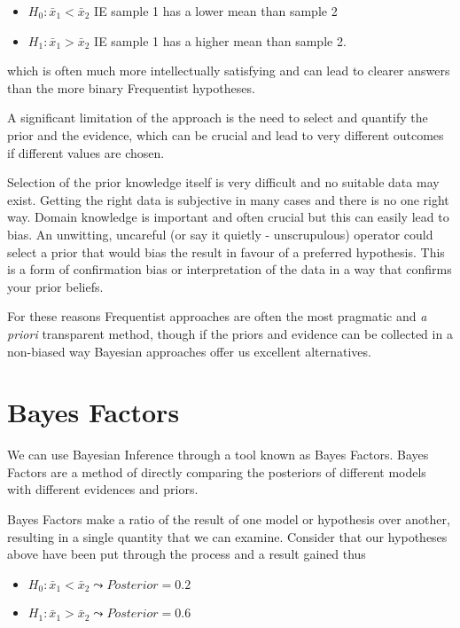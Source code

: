 \documentclass[
]{book}
\providecommand{\tightlist}{%
  \setlength{\itemsep}{0pt}\setlength{\parskip}{0pt}}
\begin{document}
\begin{itemize}
\tightlist
\item
  \(H_0 : \bar{x}_1 < \bar{x}_2\) IE sample 1 has a lower mean than sample 2
\item
  \(H_1 : \bar{x}_1 > \bar{x}_2\) IE sample 1 has a higher mean than sample 2.
\end{itemize}

which is often much more intellectually satisfying and can lead to clearer answers than the more binary Frequentist hypotheses.

A significant limitation of the approach is the need to select and quantify the prior and the evidence, which can be crucial and lead to very different outcomes if different values are chosen.

Selection of the prior knowledge itself is very difficult and no suitable data may exist. Getting the right data is subjective in many cases and there is no one right way. Domain knowledge is important and often crucial but this can easily lead to bias. An unwitting, uncareful (or say it quietly - unscrupulous) operator could select a prior that would bias the result in favour of a preferred hypothesis. This is a form of confirmation bias or interpretation of the data in a way that confirms your prior beliefs.

For these reasons Frequentist approaches are often the most pragmatic and \emph{a priori} transparent method, though if the priors and evidence can be collected in a non-biased way Bayesian approaches offer us excellent alternatives.

\hypertarget{bayes-factors}{%
\section{Bayes Factors}\label{bayes-factors}}

We can use Bayesian Inference through a tool known as Bayes Factors. Bayes Factors are a method of directly comparing the posteriors of different models with different evidences and priors.

Bayes Factors make a ratio of the result of one model or hypothesis over another, resulting in a single quantity that we can examine. Consider that our hypotheses above have been put through the process and a result gained thus

\begin{itemize}
\tightlist
\item
  \(H_0 : \bar{x}_1 < \bar{x}_2 \leadsto Posterior = 0.2\)
\item
  \(H_1 : \bar{x}_1 > \bar{x}_2 \leadsto Posterior = 0.6\)
\end{itemize}
\end{document}
